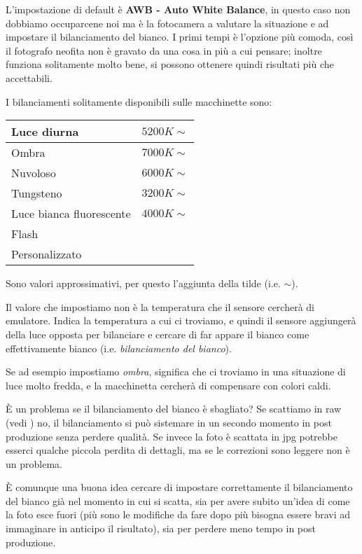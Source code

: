 L'impostazione di default è \textbf{AWB - Auto White Balance}, in questo caso non dobbiamo occuparcene noi ma è la fotocamera a valutare la situazione e ad impostare il bilanciamento del bianco.
I primi tempi è l'opzione più comoda, così il fotografo neofita non è gravato da una cosa in più a cui pensare; inoltre funziona solitamente molto bene, si possono ottenere quindi risultati più che accettabili.

I bilanciamenti solitamente disponibili sulle macchinette sono:
\begin{table}[h]
    \centering
    \begin{tabular}{|l|l|} 
    \hline
    Luce diurna              & $5200K\sim$\\ 
    \hline
    Ombra                    & $7000K\sim$\\ 
    \hline
    Nuvoloso                 & $6000K\sim$\\ 
    \hline
    Tungsteno                & $3200K\sim$\\ 
    \hline
    Luce bianca fluorescente & $4000K\sim$\\ 
    \hline
    Flash                    &                           \\ 
    \hline
    Personalizzato           &                           \\
    \hline
    \end{tabular}
\end{table}

\nb Sono valori approssimativi, per questo l'aggiunta della tilde (i.e. $\sim$).

Il valore che impostiamo non è la temperatura che il sensore cercherà di emulatore. Indica la temperatura a cui ci troviamo, e quindi il sensore aggiungerà della luce opposta per bilanciare e cercare di far appare il bianco come effettivamente bianco (i.e. \textit{bilanciamento del bianco}).

Se ad esempio impostiamo \textit{ombra}, significa che ci troviamo in una situazione di luce molto fredda, e la macchinetta cercherà di compensare con colori caldi.

È un problema se il bilanciamento del bianco è sbagliato? Se scattiamo in raw (vedi ) no, il bilanciamento si può sistemare in un secondo momento in post produzione senza perdere qualità.
Se invece la foto è scattata in jpg potrebbe esserci qualche piccola perdita di dettagli, ma se le correzioni sono leggere non è un problema.

È comunque una buona idea cercare di impostare correttamente il bilanciamento del bianco già nel momento in cui si scatta, sia per avere subito un'idea di come la foto esce fuori (più sono le modifiche da fare dopo più bisogna essere bravi ad immaginare in anticipo il risultato), sia per perdere meno tempo in post produzione.